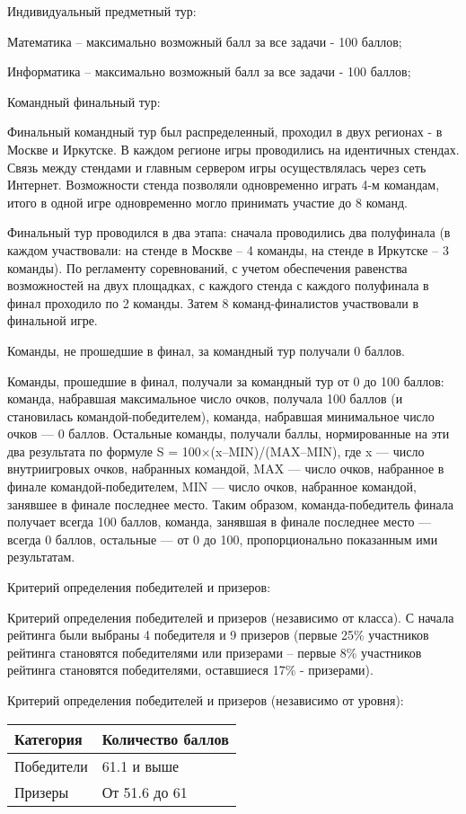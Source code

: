 Индивидуальный предметный тур:

Математика – максимально возможный балл за все задачи - 100 баллов;

Информатика – максимально возможный балл за все задачи - 100 баллов;

Командный финальный тур:

Финальный командный тур был распределенный, проходил в двух регионах - в Москве и Иркутске. В каждом регионе игры проводились на идентичных стендах. Связь между стендами и главным сервером игры осуществлялась через сеть Интернет. Возможности стенда позволяли одновременно играть 4-м командам, итого в одной игре одновременно могло принимать участие до 8 команд.

Финальный тур проводился в два этапа: сначала проводились два полуфинала (в каждом участвовали: на стенде в Москве – 4 команды, на стенде в Иркутске – 3 команды). По регламенту соревнований, с учетом обеспечения равенства возможностей на двух площадках, с каждого стенда с каждого полуфинала в финал проходило по 2 команды. Затем 8 команд-финалистов участвовали в финальной игре.

Команды, не прошедшие в финал, за командный тур получали 0 баллов.

Команды, прошедшие в финал, получали за командный тур от 0 до 100 баллов: команда, набравшая максимальное число очков, получала 100 баллов (и становилась командой-победителем), команда, набравшая минимальное число очков — 0 баллов. Остальные команды, получали баллы, нормированные на эти два результата по формуле S = 100×(x–MIN)/(MAX–MIN), где x — число внутриигровых очков, набранных командой, MAX — число очков, набранное в финале командой-победителем, MIN — число очков, набранное командой, занявшее в финале последнее место. Таким образом, команда-победитель финала получает всегда 100 баллов, команда, занявшая в финале последнее место — всегда 0 баллов, остальные — от 0 до 100, пропорционально показанным ими результатам.

Критерий определения победителей и призеров:

Критерий определения победителей и призеров (независимо от класса). С начала рейтинга были выбраны 4 победителя и 9 призеров (первые 25\% участников рейтинга становятся победителями или призерами – первые 8\% участников рейтинга становятся победителями, оставшиеся 17\% - призерами).

Критерий определения победителей и призеров (независимо от уровня):
\begin{center}
    \begin{tabular}{|l|l|}
        \hline
        Категория&Количество баллов\\
        \hline
        Победители&61.1 и выше\\
        \hline
        Призеры&От 51.6 до 61\\
        \hline
    \end{tabular}
\end{center}